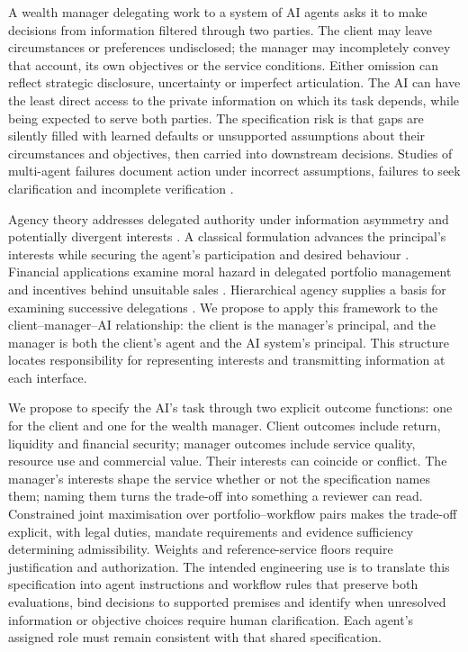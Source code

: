 \documentclass[oneside,10pt,english]{swissi}
\begin{document}
A wealth manager delegating work to a system of AI agents asks it to make decisions from information filtered through two parties. The client may leave circumstances or preferences undisclosed; the manager may incompletely convey that account, its own objectives or the service conditions. Either omission can reflect strategic disclosure, uncertainty or imperfect articulation. The AI can have the least direct access to the private information on which its task depends, while being expected to serve both parties. The specification risk is that gaps are silently filled with learned defaults or unsupported assumptions about their circumstances and objectives, then carried into downstream decisions. Studies of multi-agent failures document action under incorrect assumptions, failures to seek clarification and incomplete verification \parencite{cemri2025fail}.

Agency theory addresses delegated authority under information asymmetry and potentially divergent interests \parencite{jensen1976theory}. A classical formulation advances the principal's interests while securing the agent's participation and desired behaviour \parencite{holmstrom1979moral}. Financial applications examine moral hazard in delegated portfolio management and incentives behind unsuitable sales \parencite{stoughton1993moral,inderst2009misselling}. Hierarchical agency supplies a basis for examining successive delegations \parencite{tirole1986hierarchies}. We propose to apply this framework to the client--manager--AI relationship: the client is the manager's principal, and the manager is both the client's agent and the AI system's principal. This structure locates responsibility for representing interests and transmitting information at each interface.

We propose to specify the AI's task through two explicit outcome functions: one for the client and one for the wealth manager. Client outcomes include return, liquidity and financial security; manager outcomes include service quality, resource use and commercial value. Their interests can coincide or conflict. The manager's interests shape the service whether or not the specification names them; naming them turns the trade-off into something a reviewer can read. Constrained joint maximisation over portfolio--workflow pairs makes the trade-off explicit, with legal duties, mandate requirements and evidence sufficiency determining admissibility. Weights and reference-service floors require justification and authorization. The intended engineering use is to translate this specification into agent instructions and workflow rules that preserve both evaluations, bind decisions to supported premises and identify when unresolved information or objective choices require human clarification. Each agent's assigned role must remain consistent with that shared specification.
\end{document}
